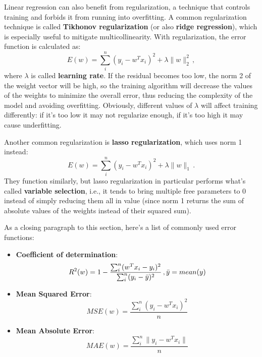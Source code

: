 Linear regression can also benefit from regularization, a technique that controls training and forbids it from running into overfitting. A common regularization technique is called \textbf{Tikhonov regularization} (or also \textbf{ridge regression}), which is especially useful to mitigate multicollinearity. With regularization, the error function is calculated as:
\begin{equation*}
    E(w) = \sum_i^n (y_i - w^Tx_i)^2 + \lambda \|w\|_2^2 \,,
\end{equation*}
where $\lambda$ is called \textbf{learning rate}.
If the residual becomes too low, the norm 2 of the weight vector will be high, so the training algorithm will decrease the values of the weights to minimize the overall error, thus reducing the complexity of the model and avoiding overfitting. Obviously, different values of $\lambda$ will affect training differently: if it's too low it may not regularize enough, if it's too high it may cause underfitting.

Another common regularization is \textbf{lasso regularization}, which uses norm 1 instead:
\begin{equation*}
    E(w) = \sum_i^n (y_i - w^Tx_i)^2 + \lambda \|w\|_1 \,.
\end{equation*}
They function similarly, but lasso regularization in particular performs what's called \textbf{variable selection}, i.e., it tends to bring multiple free parameters to 0 instead of simply reducing them all in value (since norm 1 returns the sum of absolute values of the weights instead of their squared sum).

As a closing paragraph to this section, here's a list of commonly used error functions:
\begin{itemize}
    \item \textbf{Coefficient of determination}:
    \begin{equation*}
        R^2(w) = 1 - \dfrac{\sum_i^n (w^Tx_i - y_i)^2}{\sum_i^n (y_i - \Bar{y})^2} \,, \Bar{y} = mean(y)
    \end{equation*}

    \item \textbf{Mean Squared Error}:
    \begin{equation*}
        MSE(w) = \dfrac{\sum_i^n (y_i - w^T x_i)^2}{n}
    \end{equation*}

    \item \textbf{Mean Absolute Error}:
    \begin{equation*}
        MAE(w) = \dfrac{\sum_i^n \|y_i - w^T x_i\|}{n}
    \end{equation*}
\end{itemize}


